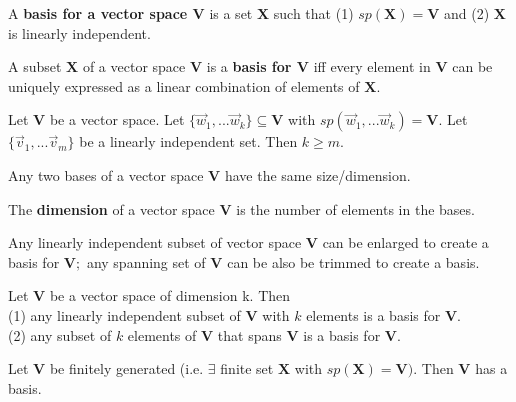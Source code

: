 \documentclass{article}
\begin{document}
\begin{definition}
A \textbf{basis for a vector space $\boldsymbol{V}$} is a set $\boldsymbol{X}$ such that (1) $sp(\boldsymbol{X}) = \boldsymbol{V}$ and (2) $\boldsymbol{X}$ is linearly independent.
\end{definition}

\begin{theorem}
A subset $\boldsymbol{X}$ of a vector space $\boldsymbol{V}$ is a \textbf{basis for $\boldsymbol{V}$} iff every element in $\boldsymbol{V}$ can be uniquely expressed as a linear combination of elements of $\boldsymbol{X}.$ 
\end{theorem}

\begin{theorem}
Let $\boldsymbol{V}$ be a vector space. Let $\{\vec{w}_{1}, ... \vec{w}_{k}\} \subseteq \boldsymbol{V}$ with $sp(\vec{w}_{1}, ... \vec{w}_{k}) = \boldsymbol{V}.$ Let $\{\vec{v}_{1}, ... \vec{v}_{m}\}$ be a linearly independent set. Then $k \geq m.$
\end{theorem}

\begin{corollary}
Any two bases of a vector space $\boldsymbol{V}$ have the same size/dimension.
\end{corollary}

\begin{definition}
The \textbf{dimension} of a vector space $\boldsymbol{V}$ is the number of elements in the bases.
\end{definition}

\begin{theorem}
Any linearly independent subset of vector space $\boldsymbol{V}$ can be enlarged to create a basis for $\boldsymbol{V};$ any spanning set of $\boldsymbol{V}$ can be also be trimmed to create a basis.
\end{theorem}

\begin{theorem}
Let $\boldsymbol{V}$ be a vector space of dimension k. Then \\
(1) any linearly independent subset of $\boldsymbol{V}$ with $k$ elements is a basis for $\boldsymbol{V}.$ \\
(2) any subset of $k$ elements of $\boldsymbol{V}$ that spans $\boldsymbol{V}$ is a basis for $\boldsymbol{V}$.
\end{theorem}

\begin{theorem}
Let $\boldsymbol{V}$ be finitely generated (i.e. $\exists$ finite set $\boldsymbol{X}$ with $sp(\boldsymbol{X}) = \boldsymbol{V}).$ Then $\boldsymbol{V}$ has a basis.
\end{theorem}
\end{document}
